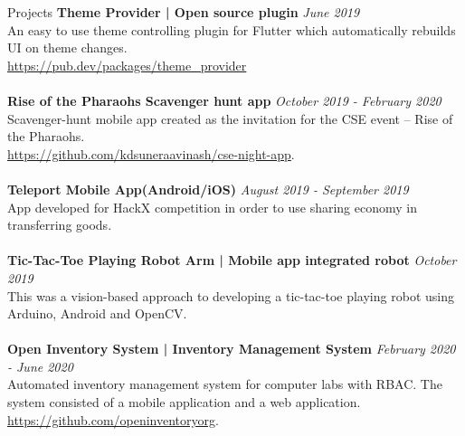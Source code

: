 \documentclass{cv}
\begin{document}
\begin{adjustwidth}{55pt}{0pt}
\begin{rSection}{Projects}
{\bf Theme Provider | Open source plugin}                        \hfill {\em June 2019} 
\\An easy to use theme controlling plugin for Flutter which automatically rebuilds UI on theme changes.\\
\url{https://pub.dev/packages/theme\_provider} \\
\\{\bf Rise of the Pharaohs Scavenger hunt app}                 \hfill {\em October 2019 - February 2020} 
\\Scavenger-hunt mobile app created as the invitation for the CSE event – Rise of the Pharaohs.\\
\url{https://github.com/kdsuneraavinash/cse-night-app}. \\
\\{\bf Teleport Mobile App(Android/iOS)}                        \hfill {\em August 2019 - September 2019} 
\\App developed for HackX competition in order to use sharing economy in transferring goods. \\
\\{\bf Tic-Tac-Toe Playing Robot Arm | Mobile app integrated robot}     \hfill {\em October 2019}
\\This was a vision-based approach to developing a tic-tac-toe playing robot using Arduino, Android and OpenCV.\\
\\{\bf Open Inventory System | Inventory Management System}     \hfill {\em February 2020 - June 2020} 
\\Automated inventory management system for computer labs with RBAC. The system consisted of a mobile application and a web application.\\
\url{https://github.com/openinventoryorg}.\\
\end{rSection}

\end{adjustwidth}
\end{document}
